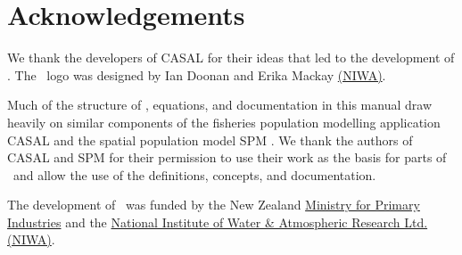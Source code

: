 \section{Acknowledgements\label{sec:acknowledgements}}

We thank the developers of CASAL \citep{1388} for their ideas that led to the development of \CNAME. The \CNAME\ logo was designed by Ian Doonan and Erika Mackay \href{http://www.niwa.co.nz}{(NIWA)}.

Much of the structure of \CNAME, equations, and documentation in this manual draw heavily on similar components of the fisheries population modelling application CASAL \citep{1388} and  the spatial population model SPM \citep{SPM}. We thank the authors of CASAL and SPM for their permission to use their work as the basis for parts of \CNAME\ and allow the use of the definitions, concepts, and documentation.

The development of \CNAME\ was funded by the New Zealand \href{http://www.mpi.govt.nz}{Ministry for Primary Industries} and the \href{http://www.niwa.co.nz}{National Institute of Water \& Atmospheric Research Ltd. (NIWA)}.
